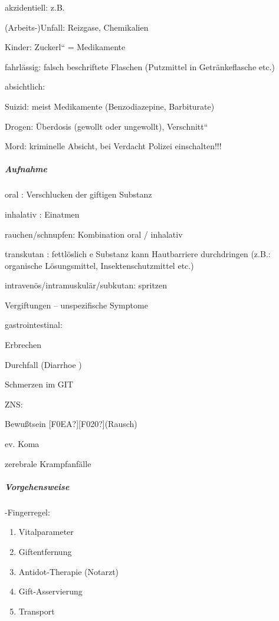 {\mdseries
akzidentiell: z.B.}

(Arbeits-)Unfall: Reizgase, Chemikalien

Kinder: {\quotedblbase}Zuckerl{\textquotedblleft} = Medikamente

fahrlässig: falsch beschriftete Flaschen  (Putzmittel in
Getränkeflasche etc.)

{\mdseries
absichtlich:}

Suizid: meist Medikamente (Benzodiazepine,  Barbiturate)

Drogen: \"Uberdosis (gewollt oder ungewollt), 
{\quotedblbase}Verschnitt{\textquotedblleft}

Mord: kriminelle Absicht, bei Verdacht Polizei  einschalten!!!

\subparagraph*{Aufnahme}

{\mdseries
oral : Verschlucken  der giftigen  Substanz }

{\mdseries
inhalativ : Einatmen}

{\mdseries
rauchen/schnupfen: Kombination oral /  inhalativ}

{\mdseries
transkutan : fettlöslich e Substanz kann  Hautbarriere durchdringen
(z.B.:  organische Lösungsmittel,  Insektenschutzmittel etc.)}

{\mdseries
intravenös/intramuskulär/subkutan: spritzen}

{\mdseries
Vergiftungen -- unspezifische  Symptome}

{\mdseries
gastrointestinal:}

{\mdseries
Erbrechen}

{\mdseries
Durchfall (Diarrhoe )}

{\mdseries
Schmerzen im GIT}

{\mdseries
ZNS:}

{\mdseries
Bewu{\ss}tsein [F0EA?][F020?](Rausch)}

{\mdseries
ev. Koma}

{\mdseries
zerebrale Krampfanfälle}

\subparagraph*{Vorgehensweise}

{-Fingerregel:}

\begin{enumerate}
\item Vitalparameter
\item Giftentfernung
\item Antidot-Therapie (Notarzt)
\item Gift-Asservierung
\item Transport
\end{enumerate}


